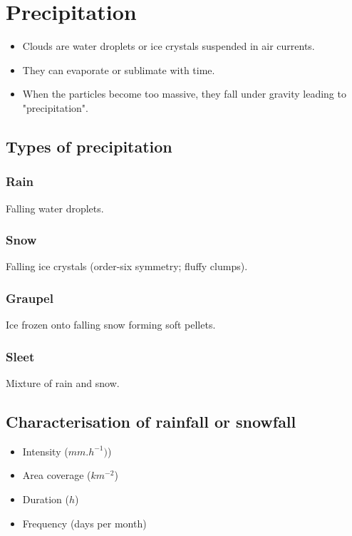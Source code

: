 \documentclass[11pt]{article}
\begin{document}
\newpage

\section{Precipitation}
\label{sec:org1696cf4}
\begin{itemize}
\item Clouds are water droplets or ice crystals suspended in air currents.
\item They can evaporate or sublimate with time.
\item When the particles become too massive, they fall under gravity leading to "precipitation".
\end{itemize}

\subsection{Types of precipitation}
\label{sec:org39cca12}

\subsubsection{Rain}
\label{sec:org007a1aa}
Falling water droplets.

\subsubsection{Snow}
\label{sec:org47fbcbb}
Falling ice crystals (order-six symmetry; fluffy clumps).

\subsubsection{Graupel}
\label{sec:orgfb3bfd4}
Ice frozen onto falling snow forming soft pellets.

\subsubsection{Sleet}
\label{sec:org6d5c2b8}
Mixture of rain and snow.

\subsection{Characterisation of rainfall or snowfall}
\label{sec:orgb99394a}
\begin{itemize}
\item Intensity (\(\unit{mm.h^{-1}})\))
\item Area coverage (\(\unit{km^{-2}}\))
\item Duration (\(\unit{h}\))
\item Frequency (days per month)
\end{itemize}
\end{document}
